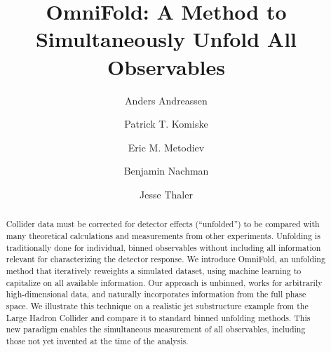 \documentclass[prl,twocolumn,superscriptaddress,longbibliography,preprintnumbers,nofootinbib]{revtex4-1}
\newcommand{\OmniFold}{{\sc OmniFold}\xspace}
\begin{document}
\title{OmniFold: A Method to Simultaneously Unfold All Observables}


\author{Anders Andreassen}

\author{Patrick T. Komiske}

\author{Eric M. Metodiev}

\author{Benjamin Nachman}

\author{Jesse Thaler}


\begin{abstract}
%
Collider data must be corrected for detector effects (``unfolded'') to be compared with many theoretical calculations and measurements from other experiments.
%
Unfolding is traditionally done for individual, binned observables without including all information relevant for characterizing the detector response.
%
We introduce \OmniFold, an unfolding method that iteratively reweights a simulated dataset, using machine learning to capitalize on all available information.
%
Our approach is unbinned, works for arbitrarily high-dimensional data, and naturally incorporates information from the full phase space.
%
We illustrate this technique on a realistic jet substructure example from the Large Hadron Collider and compare it to standard binned unfolding methods.
%
This new paradigm enables the simultaneous measurement of all observables, including those not yet invented at the time of the analysis.
%
\hspace{-.5in}
\end{abstract}


\maketitle
\end{document}
